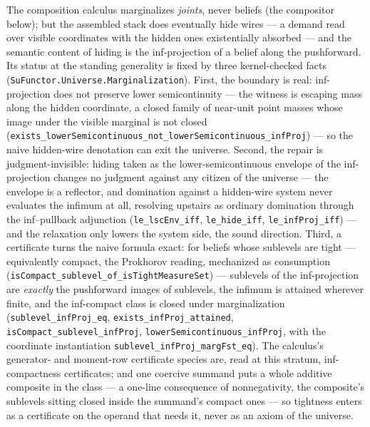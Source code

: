 \begin{remark}
\label{rem:su-marginalization-lsc}
The composition calculus marginalizes \emph{joints}, never
beliefs (the compositor below); but the assembled stack does
eventually hide wires --- a demand read over visible coordinates
with the hidden ones existentially absorbed --- and the semantic
content of hiding is the inf-projection of a belief along the
pushforward. Its status at the standing generality is fixed by
three kernel-checked facts
(\texttt{SuFunctor.Universe.Marginalization}). First, the boundary
is real: inf-projection does not preserve lower semicontinuity ---
the witness is escaping mass along the hidden coordinate, a closed
family of near-unit point masses whose image under the visible
marginal is not closed
(\texttt{exists\_lowerSemicontinuous\_not\_lowerSemicontinuous\_infProj})
--- so the naive hidden-wire denotation can exit the universe.
Second, the repair is judgment-invisible: hiding taken as the
lower-semicontinuous envelope of the inf-projection changes no
judgment against any citizen of the universe --- the envelope is a
reflector, and domination against a hidden-wire system never
evaluates the infimum at all, resolving upstairs as ordinary
domination through the inf--pullback adjunction
(\texttt{le\_lscEnv\_iff}, \texttt{le\_hide\_iff},
\texttt{le\_infProj\_iff}) --- and the relaxation only lowers the
system side, the sound direction. Third, a certificate turns the
naive formula exact: for beliefs whose sublevels are tight ---
equivalently compact, the Prokhorov reading, mechanized as
consumption
(\texttt{isCompact\_sublevel\_of\_isTightMeasureSet}) --- sublevels
of the inf-projection are \emph{exactly} the pushforward images of
sublevels, the infimum is attained wherever finite, and the
inf-compact class is closed under marginalization
(\texttt{sublevel\_infProj\_eq},
\texttt{exists\_infProj\_attained},
\texttt{isCompact\_sublevel\_infProj},
\texttt{lowerSemicontinuous\_infProj}, with the coordinate
instantiation \texttt{sublevel\_infProj\_margFst\_eq}). The
calculus's generator- and moment-row certificate species are, read at
this stratum, inf-compactness certificates; and one coercive
summand puts a whole additive composite in the class --- a one-line
consequence of nonnegativity, the composite's sublevels sitting
closed inside the summand's compact ones --- so
tightness enters as a certificate on the operand that needs it,
never as an axiom of the universe.
\end{remark}


